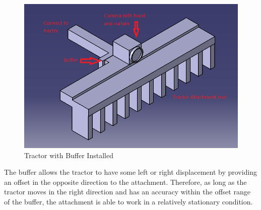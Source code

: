 \documentclass[letterpaper,12pt,oneside]{book}
\begin{document}
		\begin{figure}[ht!]
			\begin{center}
				\includegraphics[scale = 0.8]{attachmentwithbuffer.png}
				\caption{Tractor with Buffer Installed}
			\end{center}
		\end{figure} 
		
		The buffer allows the tractor to have some left or right displacement by providing an offset in the opposite direction to the attachment. Therefore, as long as the tractor moves in the right direction and has an accuracy within the offset range of the buffer, the attachment is able to work in a relatively stationary condition. 
		
\end{document}

